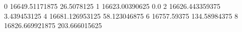 0 16649.51171875 26.5078125
1 16623.00390625 0.0
2 16626.443359375 3.439453125
4 16681.126953125 58.123046875
6 16757.59375 134.58984375
8 16826.669921875 203.666015625
